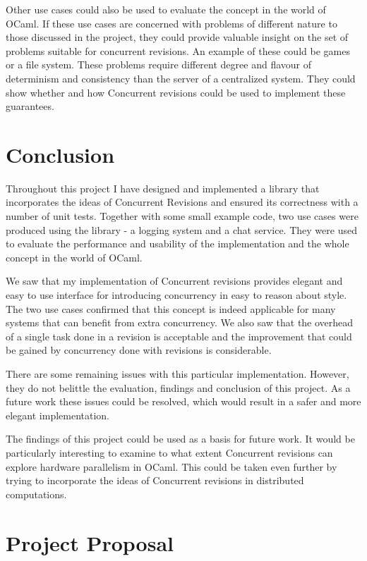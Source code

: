 \documentclass[12pt,twoside,notitlepage]{report}
\begin{document}
Other use cases could also be used to evaluate the concept in the world of OCaml. If these use cases are concerned with problems of different nature to those discussed in the project, they could provide valuable insight on the set of problems suitable for concurrent revisions. An example of these could be games or a file system. These problems require different degree and flavour of determinism and consistency than the server of a centralized system. They could show whether and how Concurrent revisions could be used to implement these guarantees. 

\cleardoublepage
\chapter{Conclusion}

Throughout this project I have designed and implemented a library that incorporates the ideas of Concurrent Revisions and ensured its correctness with a number of unit tests. Together with some small example code, two use cases were produced using the library - a logging system and a chat service. They were used to evaluate the performance and usability of the implementation and the whole concept in the world of OCaml.

We saw that my implementation of Concurrent revisions provides elegant and easy to use interface for introducing concurrency in easy to reason about style. The two use cases confirmed that this concept is indeed applicable for many systems that can benefit from extra concurrency. We also saw that the overhead of a single task done in a revision is acceptable and the improvement that could be gained by concurrency done with revisions is considerable.

There are some remaining issues with this particular implementation. However, they do not belittle the evaluation, findings and conclusion of this project. As a future work these issues could be resolved, which would result in a safer and more elegant implementation.

The findings of this project could be used as a basis for future work. It would be particularly interesting to examine to what extent Concurrent revisions can explore hardware parallelism in OCaml. This could be taken even further by trying to incorporate the ideas of Concurrent revisions in distributed computations.       


\cleardoublepage


 
\cleardoublepage 
\nocite{*}
\appendix


\chapter{Project Proposal}

%
\end{document}
